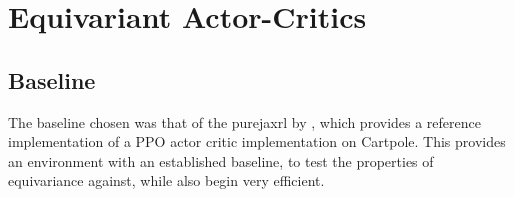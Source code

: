 \chapter{Equivariant Actor-Critics}
\section{Baseline}
The baseline chosen was that of the purejaxrl by \cite{lu2022discovered}, which provides a reference implementation of a PPO actor critic implementation on Cartpole. This provides an environment with an established baseline, to test the properties of equivariance against, while also begin very efficient.